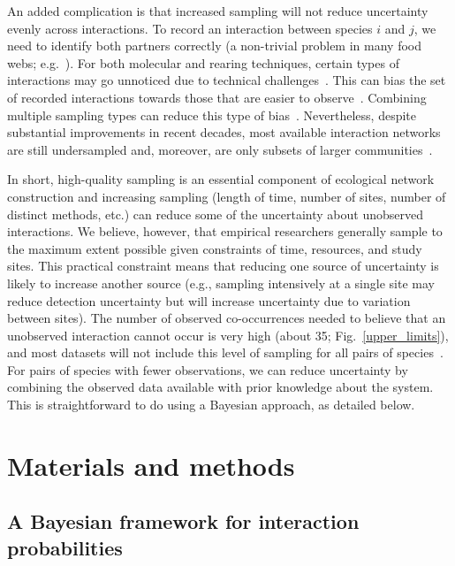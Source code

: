 \documentclass[12pt]{article}
\begin{document}
\begin{spacing}{2.0}
        An added complication is that increased sampling will not reduce uncertainty evenly across interactions. To record an interaction between species $i$ and $j$, we need to identify both partners correctly (a non-trivial problem in many food webs; e.g.~\citealp{Kaartinen2011,Roslin2016}). For both molecular and rearing techniques, certain types of interactions may go unnoticed due to technical challenges~\citep{Wirta2014}. This can bias the set of recorded interactions towards those that are easier to observe~\citep{Carstensen2014,Jordano2016}. Combining multiple sampling types can reduce this type of bias~\citep{Wirta2014,Jordano2016}. Nevertheless, despite substantial improvements in recent decades, most available interaction networks are still undersampled and, moreover, are only subsets of larger communities~\citep{Bartomeus2013,Jordano2016}. 


        In short, high-quality sampling is an essential component of ecological network construction and increasing sampling (length of time, number of sites, number of distinct methods, etc.) can reduce some of the uncertainty about unobserved interactions. We believe, however, that empirical researchers generally sample to the maximum extent possible given constraints of time, resources, and study sites. This practical constraint means that reducing one source of uncertainty is likely to increase another source (e.g., sampling intensively at a single site may reduce detection uncertainty but will increase uncertainty due to variation between sites). The number of observed co-occurrences needed to believe that an unobserved interaction cannot occur is very high (about 35; Fig.~\ref{upper_limits}), and most datasets will not include this level of sampling for all pairs of species~\citep{Bartomeus2013}. For pairs of species with fewer observations, we can reduce uncertainty by combining the observed data available with prior knowledge about the system. This is straightforward to do using a Bayesian approach, as detailed below.


\section*{Materials and methods}

  \subsection*{A Bayesian framework for interaction probabilities}




\end{spacing}
\end{document}
